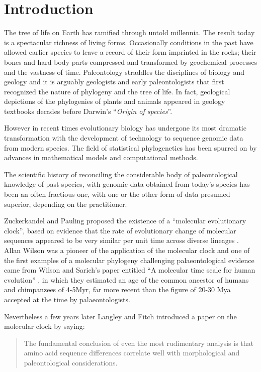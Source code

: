 \section{Introduction} 

The tree of life on Earth has ramified through untold millennia. The result today is a spectacular richness of living forms. Occasionally conditions in the past have allowed earlier species to leave a record of their form imprinted in the rocks; their bones and hard body parts compressed and transformed by geochemical processes and the vastness of time. Paleontology straddles the disciplines of biology and geology and it is arguably geologists and early paleontologists that first recognized the nature of phylogeny and the tree of life. In fact, geological depictions of the phylogenies of plants and animals appeared in geology textbooks decades before Darwin's ``{\em Origin of species}''.

However in recent times evolutionary biology has undergone its most dramatic transformation with the development of technology to sequence genomic data from modern species. The field of statistical phylogenetics has been spurred on by advances in mathematical models and computational methods.

The scientific history of reconciling the considerable body of paleontological knowledge of past species, with genomic data obtained from today's species has been an often fractious one, with one or the other form of data presumed superior, depending on the practitioner.

Zuckerkandel and Pauling proposed the existence of a ``molecular evolutionary clock'', based on evidence that the rate of evolutionary change of molecular sequences appeared to be very similar per unit time across diverse lineages \cite{zuckerkandl1965}. Allan Wilson was a pioneer of the application of the molecular clock and one of the first examples of a molecular phylogeny challenging palaeontological evidence came from Wilson and Sarich's paper entitled ``A molecular time scale for human evolution'' \cite{WilsonSarich1969}, in which they estimated an age of the common ancestor of humans and chimpanzees of 4-5Myr, far more recent than the figure of 20-30 Mya accepted at the time by palaeontologists.

Nevertheless a few years later Langley and Fitch \cite{LangleyFitch1974} introduced a paper on the molecular clock by saying:

\begin{quotation}
The fundamental conclusion of even the most rudimentary analysis is that amino acid sequence differences correlate well with morphological and paleontological considerations.
\end{quotation}

